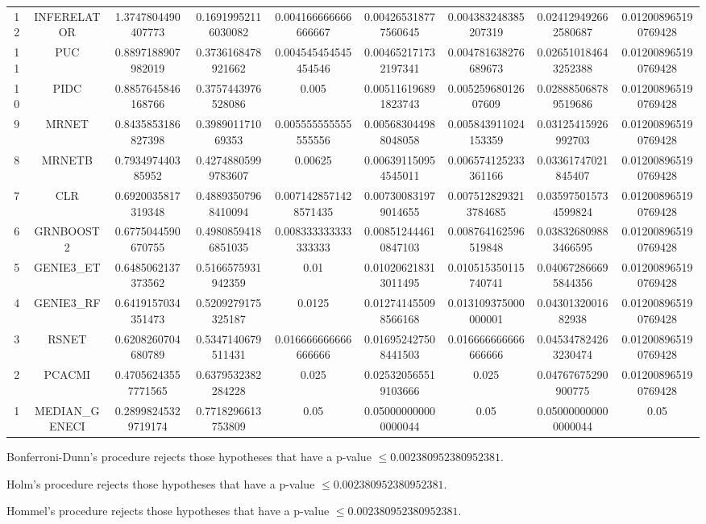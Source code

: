 \documentclass[a4paper,10pt]{article}
\begin{document}
\begin{landscape}
\begin{table}[!htp]
\begin{tabular}{ccccccccc}
12&INFERELATOR&1.3747804490407773&0.16919952116030082&0.004166666666666667&0.004265318777560645&0.004383248385207319&0.024129492662580687&0.012008965190769428\\
11&PUC&0.8897188907982019&0.3736168478921662&0.004545454545454546&0.004652171732197341&0.004781638276689673&0.026510184643252388&0.012008965190769428\\
10&PIDC&0.8857645846168766&0.3757443976528086&0.005&0.005116196891823743&0.00525968012607609&0.028885068789519686&0.012008965190769428\\
9&MRNET&0.8435853186827398&0.398901171069353&0.005555555555555556&0.005683044988048058&0.005843911024153359&0.03125415926992703&0.012008965190769428\\
8&MRNETB&0.793497440385952&0.42748805999783607&0.00625&0.006391150954545011&0.006574125233361166&0.03361747021845407&0.012008965190769428\\
7&CLR&0.6920035817319348&0.48893507968410094&0.0071428571428571435&0.007300831979014655&0.0075128293213784685&0.035975015734599824&0.012008965190769428\\
6&GRNBOOST2&0.6775044590670755&0.49808594186851035&0.008333333333333333&0.008512444610847103&0.008764162596519848&0.038326809883466595&0.012008965190769428\\
5&GENIE3_ET&0.6485062137373562&0.5166575931942359&0.01&0.010206218313011495&0.010515350115740741&0.040672866695844356&0.012008965190769428\\
4&GENIE3_RF&0.6419157034351473&0.5209279175325187&0.0125&0.012741455098566168&0.013109375000000001&0.0430132001682938&0.012008965190769428\\
3&RSNET&0.6208260704680789&0.5347140679511431&0.016666666666666666&0.016952427508441503&0.016666666666666666&0.045347824263230474&0.012008965190769428\\
2&PCACMI&0.47056243557771565&0.6379532382284228&0.025&0.025320565519103666&0.025&0.04767675290900775&0.012008965190769428\\
1&MEDIAN_GENECI&0.28998245329719174&0.7718296613753809&0.05&0.050000000000000044&0.05&0.050000000000000044&0.05\\
\hline
\end{tabular}
\end{table}
Bonferroni-Dunn's procedure rejects those hypotheses that have a p-value $\le0.002380952380952381$.


Holm's procedure rejects those hypotheses that have a p-value $\le0.002380952380952381$.


Hommel's procedure rejects those hypotheses that have a p-value $\le0.002380952380952381$.



\end{landscape}
\end{document}
